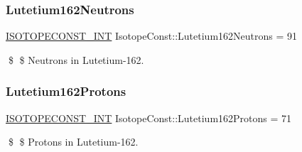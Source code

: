 \subsubsection{\texorpdfstring{Lutetium162\+Neutrons}{Lutetium162Neutrons}}
{\footnotesize\ttfamily \mbox{\hyperlink{group___isotope_const-_macros_ga5f18360b3e99483a35c32d789e62621c}{I\+S\+O\+T\+O\+P\+E\+C\+O\+N\+S\+T\+\_\+\+I\+NT}} Isotope\+Const\+::\+Lutetium162\+Neutrons = 91}

\$ \$ Neutrons in Lutetium-\/162. \mbox{\label{group___isotope_const-_lutetium-_lu162_gaa6a62de9ada71f17903ed2886cadfc3d}} 
\subsubsection{\texorpdfstring{Lutetium162\+Protons}{Lutetium162Protons}}
{\footnotesize\ttfamily \mbox{\hyperlink{group___isotope_const-_macros_ga5f18360b3e99483a35c32d789e62621c}{I\+S\+O\+T\+O\+P\+E\+C\+O\+N\+S\+T\+\_\+\+I\+NT}} Isotope\+Const\+::\+Lutetium162\+Protons = 71}

\$ \$ Protons in Lutetium-\/162. 